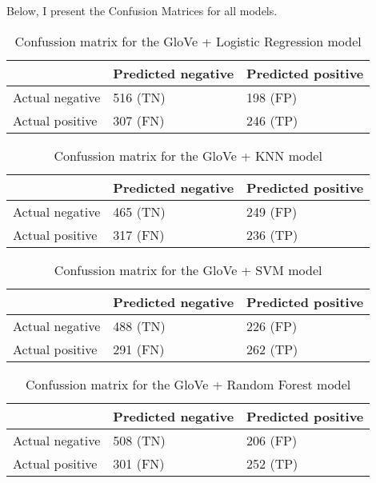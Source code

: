 Below, I present the Confusion Matrices for all models.
\vspace{1cm}



\begin{table}[H]
\centering
{
\makegapedcells
\begin{tabular}{lll}
                & Predicted negative & Predicted positive \\
\hline
Actual negative & 516 (TN)           & 198 (FP) \\
Actual positive & 307 (FN)           & 246 (TP) \\
\hline
\end{tabular}
}
\caption{Confussion matrix for the GloVe + Logistic Regression model}
\label{glovelr_cm}
\end{table}

\begin{table}[H]
\centering
{
\makegapedcells
\begin{tabular}{lll}
                & Predicted negative & Predicted positive \\
\hline
Actual negative & 465 (TN)           & 249 (FP) \\
Actual positive & 317 (FN)           & 236 (TP) \\
\hline
\end{tabular}
}
\caption{Confussion matrix for the GloVe + KNN model}
\label{gloveknn_cm}
\end{table}

\begin{table}[H]
\centering
{
\makegapedcells
\begin{tabular}{lll}
                & Predicted negative & Predicted positive \\
\hline
Actual negative & 488 (TN)           & 226 (FP) \\
Actual positive & 291 (FN)           & 262 (TP) \\
\hline
\end{tabular}
}
\caption{Confussion matrix for the GloVe + SVM model}
\label{glovesvm_cm}
\end{table}

\begin{table}[H]
\centering
{
\makegapedcells
\begin{tabular}{lll}
                & Predicted negative & Predicted positive \\
\hline
Actual negative & 508 (TN)           & 206 (FP) \\
Actual positive & 301 (FN)           & 252 (TP) \\
\hline
\end{tabular}
}
\caption{Confussion matrix for the GloVe + Random Forest model}
\label{gloverf_cm}
\end{table}

